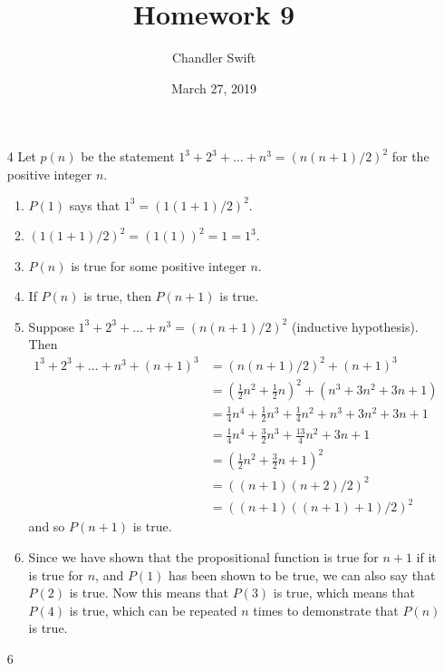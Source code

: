\documentclass{article}
\title{Homework 9}
\author{Chandler Swift}
\date{March 27, 2019}
\begin{document}
\maketitle
\begin{enumerate}
  \item[4] Let $p(n)$ be the statement $1^3 + 2^3 + \dots + n^3 = (n(n + 1)/2)^2$
    for the positive integer $n$.
    \begin{enumerate}
      \item $P(1)$ says that $1^3 = (1(1+1)/2)^2$.
      \item $(1(1+1)/2)^2 = (1(1))^2 = 1 = 1^3$.
      \item $P(n)$ is true for some positive integer $n$.
      \item If $P(n)$ is true, then $P(n+1)$ is true.
      \item Suppose $1^3 + 2^3 + \dots + n^3 = (n(n + 1)/2)^2$ (inductive
        hypothesis). Then 
        \begin{align*}
          1^3 + 2^3 + \dots + n^3 + (n+1)^3
          &= (n(n + 1)/2)^2 + (n+1)^3 \\
          &= (\frac{1}{2}n^2 + \frac{1}{2}n)^2 + (n^3 + 3n^2 + 3n + 1)\\
          &= \frac{1}{4}n^4 + \frac{1}{2}n^3 + \frac{1}{4}n^2 + n^3+3n^2+3n+1\\
          &= \frac{1}{4}n^4 + \frac{3}{2}n^3 + \frac{13}{4}n^2 + 3n + 1\\
          &= (\frac{1}{2}n^2 + \frac{3}{2}n + 1)^2 \\
          &= ((n+1)(n+2)/2)^2 \\
          &= ((n+1)((n+1)+1)/2)^2
        \end{align*}
        and so $P(n+1)$ is true.
      \item Since we have shown that the propositional function is true for
        $n+1$ if it is true for $n$, and $P(1)$ has been shown to be true, we
        can also say that $P(2)$ is true. Now this means that $P(3)$ is true,
        which means that $P(4)$ is true, which can be repeated $n$ times to
        demonstrate that $P(n)$ is true. 
    \end{enumerate}
  \item[6]


\end{enumerate}
\end{document}
